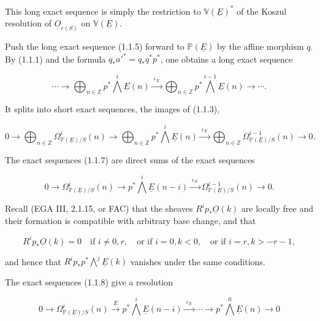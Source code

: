 This long exact sequence is simply the restriction to
$\mathbb V(\underline E)^*$ of the Koszul resolution of
$\underline O_{e(S)}$ on $\mathbb V(\underline E)$.

Push the long exact sequence (1.1.5) forward to $\mathbb P(\underline E)$ by
the affine morphism $q$.  By (1.1.1) and the formula
$q_*{a'}^*=q_*q^*p^*$, one obtains a long exact sequence

\begin{equation}\tag{1.1.6}
\cdots\longrightarrow
\bigoplus_{n\in\mathbb Z}p^*\bigwedge^i\underline E(n)
\xrightarrow{\ \iota_X\ }
\bigoplus_{n\in\mathbb Z}p^*\bigwedge^{i-1}\underline E(n)
\longrightarrow\cdots .
\end{equation}

It splits into short exact sequences, the images of (1.1.3),

\begin{equation}\tag{1.1.7}
0\longrightarrow
\bigoplus_{n\in\mathbb Z}\Omega^i_{\mathbb P(\underline E)/S}(n)
\longrightarrow
\bigoplus_{n\in\mathbb Z}p^*\bigwedge^i\underline E(n)
\xrightarrow{\ \iota_X\ }
\bigoplus_{n\in\mathbb Z}\Omega^{i-1}_{\mathbb P(\underline E)/S}(n)
\longrightarrow0.
\end{equation}

The exact sequences (1.1.7) are direct sums of the exact sequences

\begin{equation}\tag{1.1.8}
0\longrightarrow\Omega^i_{\mathbb P(\underline E)/S}(n)
\longrightarrow p^*\bigwedge^i\underline E(n-i)
\xrightarrow{\ \iota_X\ }
\Omega^{i-1}_{\mathbb P(\underline E)/S}(n)
\longrightarrow0.
\end{equation}

Recall (EGA III, 2.1.15, or FAC) that the sheaves
$R^ip_*\underline O(k)$ are locally free and their formation is compatible
with arbitrary base change, and that

\begin{equation}\tag{1.1.9}
R^ip_*\underline O(k)=0
\quad\text{if }i\ne0,r,
\quad\text{or if }i=0, k<0,
\quad\text{or if }i=r, k>-r-1,
\end{equation}

and hence that $R^ip_*p^*\bigwedge^j\underline E(k)$ vanishes under the
same conditions.

The exact sequences (1.1.8) give a resolution

\begin{equation}\tag{1.1.10}
0\longrightarrow\Omega^i_{\mathbb P(\underline E)/S}(n)
\xrightarrow{\ E\ }p^*\bigwedge^i\underline E(n-i)
\xrightarrow{\ \iota_X\ }\cdots\longrightarrow
p^*\bigwedge^0\underline E(n)\longrightarrow0
\end{equation}

